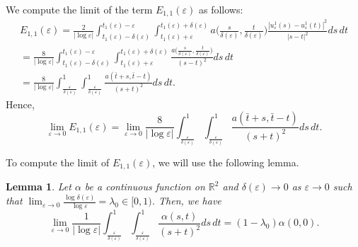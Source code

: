 \documentclass[12pt]{article}
\newtheorem{lemma}[definition]{Lemma}
\numberwithin{equation}{section}
\begin{document}
We compute the limit of the term $E_{1,1}(\varepsilon)$ as follows:
 \begin{multline*}
     E_{1,1}(\varepsilon)= \frac{2}{|\log\varepsilon|}\int_{t_{1}(\varepsilon)-\delta(\varepsilon)}^{t_{1}(\varepsilon)-\varepsilon}\int_{t_{1}(\varepsilon)+\varepsilon}^{t_{1}(\varepsilon)+\delta(\varepsilon)}a\Big(\frac{s}{\delta(\varepsilon)},\frac{t}{\delta(\varepsilon)}\Big)\frac{\left|u^{1}_{\varepsilon}(s)-u^{1}_{\varepsilon}(t)\right|^2}{\left|s-t\right|^2}ds\,dt\\
     =\frac{8}{|\log\varepsilon|}\int_{t_{1}(\varepsilon)-\delta(\varepsilon)}^{t_{1}(\varepsilon)-\varepsilon}\int_{t_{1}(\varepsilon)+\varepsilon}^{t_{1}(\varepsilon)+\delta(\varepsilon)}\frac{a\big(\frac{s}{\delta(\varepsilon)},\frac{t}{\delta(\varepsilon)}\big)}{(s-t)^2}ds\,dt
     \\=\frac{8}{|\log\varepsilon|}\int_{\frac{\varepsilon}{\delta(\varepsilon)}}^{1}\int_{\frac{\varepsilon}{\delta(\varepsilon)}}^{1}\frac{a(\bar{t}+s,\bar{t}-t)}{(s+t)^2}ds\,dt.
 \end{multline*} 
 Hence,
\begin{equation*}
    \lim_{\varepsilon\to0}E_{1,1}(\varepsilon)=\lim_{\varepsilon\to0}\frac{8}{|\log\varepsilon|}\int_{\frac{\varepsilon}{\delta(\varepsilon)}}^{1}\int_{\frac{\varepsilon}{\delta(\varepsilon)}}^{1}\frac{a\left(\bar{t}+s,\bar{t}-t\right)}{(s+t)^2}ds\,dt.
\end{equation*}

To compute the limit of  $E_{1,1}(\varepsilon)$, we will use the following lemma.
\begin{lemma}
    Let $\alpha$ be a continuous function on $\mathbb{R}^{2}$ and $\delta(\varepsilon)\to0$ as $\varepsilon\to0$ such that
    $\displaystyle\lim_{\varepsilon\to0}\frac{\log{\delta(\varepsilon)}}{\log{\varepsilon}}=\lambda_{0}\in[0,1)$.
    Then, we have 
\begin{equation*}
    \lim_{\varepsilon\to 0}\frac{1}{|\log\varepsilon|}\int_{\frac{\varepsilon}{\delta(\varepsilon)}}^{1}\int_{\frac{\varepsilon}{\delta(\varepsilon)}}^{1}\frac{\alpha(s,t)}{(s+t)^2}ds\,dt=(1-\lambda_{0}) \alpha(0,0).
\end{equation*}
\end{lemma}
\end{document}
